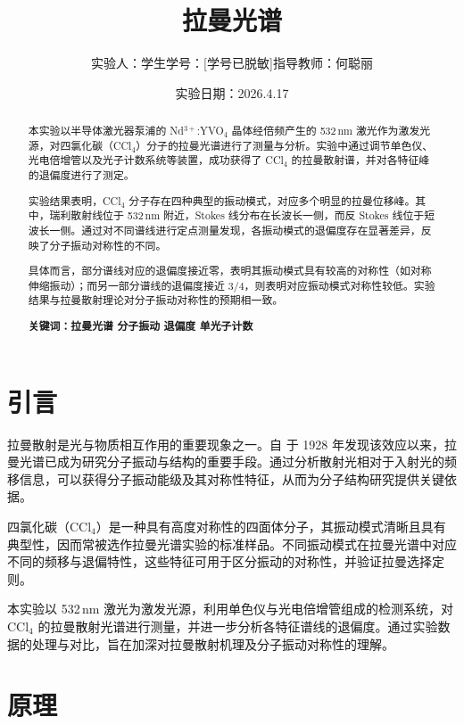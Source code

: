 \documentclass[a4paper]{ctexart}
\title{拉曼光谱}
\author{实验人：学生\qquad 学号：[学号已脱敏]\qquad 指导教师：何聪丽}
\date{实验日期：2026.4.17}
\begin{document}
    
    \maketitle
    
    \begin{abstract}
        本实验以半导体激光器泵浦的 Nd$^{3+}$:YVO$_4$ 晶体经倍频产生的 532\,nm 激光作为激发光源，对四氯化碳（CCl$_4$）分子的拉曼光谱进行了测量与分析。实验中通过调节单色仪、光电倍增管以及光子计数系统等装置，成功获得了 CCl$_4$ 的拉曼散射谱，并对各特征峰的退偏度进行了测定。

        实验结果表明，CCl$_4$ 分子存在四种典型的振动模式，对应多个明显的拉曼位移峰。其中，瑞利散射线位于 532\,nm 附近，Stokes 线分布在长波长一侧，而反 Stokes 线位于短波长一侧。通过对不同谱线进行定点测量发现，各振动模式的退偏度存在显著差异，反映了分子振动对称性的不同。

        具体而言，部分谱线对应的退偏度接近零，表明其振动模式具有较高的对称性（如对称伸缩振动）；而另一部分谱线的退偏度接近 $3/4$，则表明对应振动模式对称性较低。实验结果与拉曼散射理论对分子振动对称性的预期相一致。

        \textbf{关键词：拉曼光谱 \quad 分子振动 \quad 退偏度 \quad 单光子计数}
    \end{abstract}
    
    \section{引言}

        拉曼散射是光与物质相互作用的重要现象之一。自  于 1928 年发现该效应以来，拉曼光谱已成为研究分子振动与结构的重要手段。通过分析散射光相对于入射光的频移信息，可以获得分子振动能级及其对称性特征，从而为分子结构研究提供关键依据。

        四氯化碳（CCl$_4$）是一种具有高度对称性的四面体分子，其振动模式清晰且具有典型性，因而常被选作拉曼光谱实验的标准样品。不同振动模式在拉曼光谱中对应不同的频移与退偏特性，这些特征可用于区分振动的对称性，并验证拉曼选择定则。

        本实验以 532\,nm 激光为激发光源，利用单色仪与光电倍增管组成的检测系统，对 CCl$_4$ 的拉曼散射光谱进行测量，并进一步分析各特征谱线的退偏度。通过实验数据的处理与对比，旨在加深对拉曼散射机理及分子振动对称性的理解。  

    \section{原理}
\end{document}
